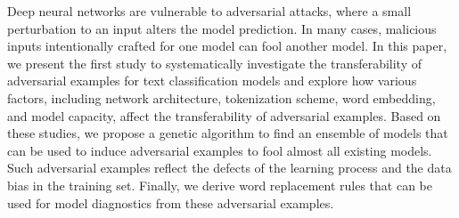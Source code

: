 Deep neural networks are vulnerable to adversarial attacks, where a small perturbation to an input alters the model prediction. In many cases, malicious inputs intentionally crafted for one model can fool another model. In this paper, we present the first study to systematically investigate the transferability of adversarial examples for text classification models and explore how various factors, including network architecture, tokenization scheme, word embedding, and model capacity, affect the transferability of adversarial examples. Based on these studies, we propose a genetic algorithm to find an ensemble of models that can be used to induce adversarial examples to fool almost all existing models. Such adversarial examples reflect the defects of the learning process and the data bias in the training set. Finally, we derive word replacement rules that can be used for model diagnostics from these adversarial examples.

